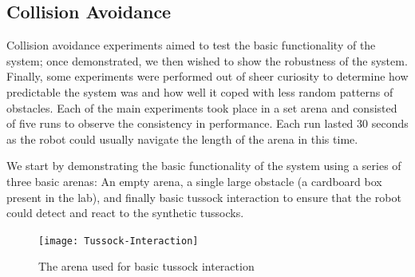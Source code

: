 \documentclass[a4paper,11pt,twoside,openright]{article}
\begin{document}
\subsection{Collision Avoidance}
Collision avoidance experiments aimed to test the basic functionality of the system; once demonstrated, we then wished to show
the robustness of the system. Finally, some experiments were performed out of sheer curiosity to determine how predictable the
system was and how well it coped with less random patterns of obstacles.
Each of the main experiments took place in a set arena and consisted of five runs to observe the consistency in performance.
Each run lasted 30 seconds as the robot could usually navigate the length of the arena in this time.
\newline

We start by demonstrating the basic functionality of the system using a series of three basic arenas: An empty arena, a single large obstacle
(a cardboard box present in the lab), and finally basic tussock interaction to ensure that the robot could detect and react to the synthetic
tussocks.

\begin{figure}[h]
  \centering
  \texttt{[image: Tussock-Interaction]}
  \caption{
    \label{fig:tussock-interaction} The arena used for basic tussock interaction
  }
\end{figure}
\end{document}
